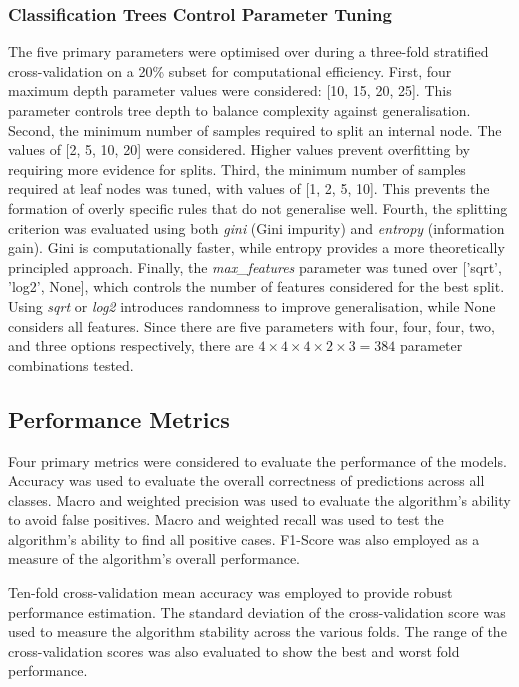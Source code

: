 \documentclass[10pt, conference]{IEEEtran}
\begin{document}
\subsubsection{Classification Trees Control Parameter Tuning}
The five primary parameters were optimised over during a three-fold stratified cross-validation on a 20\% subset for computational efficiency.  First, four maximum depth parameter values were considered: [10, 15, 20, 25]. This parameter controls tree depth to balance complexity against generalisation. Second, the minimum number of samples required to split an internal node. The values of [2, 5, 10, 20] were considered. Higher values prevent overfitting by requiring more evidence for splits. Third, the minimum number of samples required at leaf nodes was tuned, with values of [1, 2, 5, 10]. This prevents the formation of overly specific rules that do not generalise well. Fourth, the splitting criterion was evaluated using both \textit{gini} (Gini impurity) and \textit{entropy} (information gain). Gini is computationally faster, while entropy provides a more theoretically principled approach. Finally, the \textit{max\_features} parameter was tuned over ['sqrt', 'log2', None], which controls the number of features considered for the best split. Using \textit{sqrt} or \textit{log2} introduces randomness to improve generalisation, while None considers all features. Since there are five parameters with four, four, four, two, and three options respectively, there are $4 \times 4 \times 4 \times 2 \times 3 = 384$ parameter combinations tested. 


\subsection{Performance Metrics}
Four primary metrics were considered to evaluate the performance of the models. Accuracy was used to evaluate the overall correctness of predictions across all classes.  Macro and weighted precision was used to evaluate the algorithm's ability to avoid false positives. Macro and weighted recall was used to test the algorithm's ability to find all positive cases. F1-Score was also employed as a measure of the algorithm's overall performance. 

Ten-fold cross-validation mean accuracy was employed to provide robust performance estimation. The standard deviation of the cross-validation score was used to measure the algorithm stability across the various folds. The range of the cross-validation scores was also evaluated to show the best and worst fold performance. 
\end{document}
